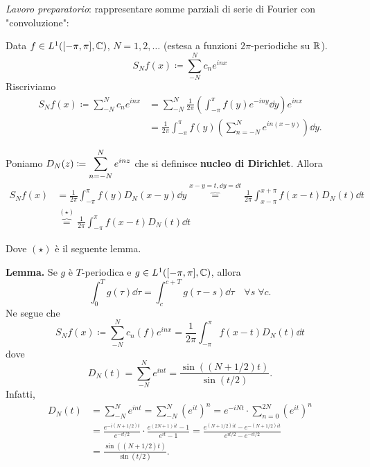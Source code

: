 \textit{Lavoro preparatorio}: rappresentare somme parziali di serie di Fourier con "convoluzione":

Data $f \in L^1([-\pi,\pi], \mathbb C) $, $N = 1,2,\ldots$ (estesa a funzioni $2\pi$-periodiche su $\mathbb R$).
%
$$
S_N f(x) \coloneqq \sum_{-N}^N c_n e^{inx}  
$$
%
Riscriviamo
%
\begin{align*}
	S_N f(x) \coloneqq \sum_{-N}^N c_n e^{inx} 
	& = \sum_{-N}^N \frac{1}{2\pi} \left( \int_{-\pi}^\pi f(y) e^{-iny} \dd y \right) e^{inx} \\
	& = \frac{1}{2\pi} \int_{-\pi}^\pi f(y) \left( \sum_{n=-N}^{N} e^{in(x-y)}  \right) \dd y.
\end{align*}

Poniamo $\displaystyle D_N(z) \coloneqq \sum_{n=-N}^{N} e^{inz} $ che si definisce \textbf{nucleo di Dirichlet}. Allora
%
\begin{align*}
	S_N f(x) & = \frac{1}{2\pi} \int_{-\pi}^\pi f(y) D_N(x-y) \dd y \overbrace{=}^{x-y=t, \dd y = \dd t} \frac{1}{2\pi} \int_{x-\pi}^{x+\pi} f(x-t) D_N(t) \dd t \\
	& \overbrace{=}^{(\star)} \frac{1}{2\pi} \int_{-\pi}^\pi f(x-t) D_N(t) \dd t 
\end{align*}

Dove $(\star)$ è il seguente lemma.

\textbf{Lemma.} Se $g$ è $T$-periodica e $g \in L^1([-\pi,\pi], \mathbb C) $, allora
%
$$
	\int_0^T g(\tau) \dd \tau = \int_c^{c+T} g(\tau-s) \dd \tau \quad \forall s \; \forall c.
$$
%
Ne segue che
%
$$
	S_N f(x) \coloneqq \sum_{-N}^{N} c_n(f) e^{inx} = \frac{1}{2\pi} \int_{-\pi}^\pi f(x-t) D_N(t) \dd t 
$$
%
dove
%
$$
	D_N(t) = \sum_{-N}^{N} e^{int} = \frac{\sin( (N+ 1/2)t)}{\sin(t/2)}.
$$
%
Infatti,
%
\begin{align*}
	D_N(t) & = \sum_{-N}^N e^{int} = \sum_{-N}^N ( e^{it} )^n = e^{-iNt} \cdot \sum_{n=0}^{2N} ( e^{it} )^n \\
	& = \frac{e^{-i(N + 1/2)t}}{e^{-i t/2}} \cdot \frac{e^{(2N+1) it} - 1}{e^{it} - 1} = \frac{e^{(N+1/2)it} - e^{-(N+1/2)it}}{e^{i t/2} - e^{-i t/2}} \\
	& = \frac{\sin ( (N+1/2)t)}{\sin(t/2)}.
\end{align*}

